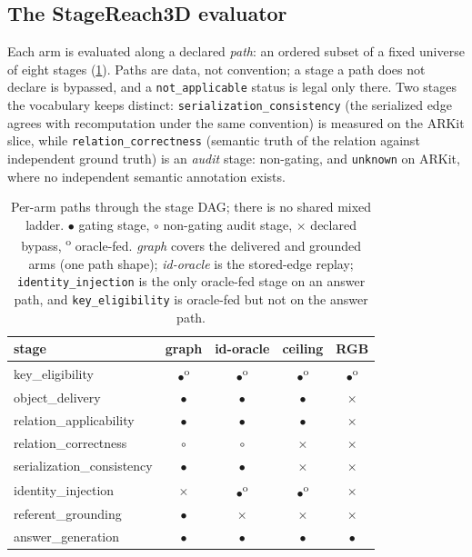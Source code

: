 \subsection{The StageReach3D evaluator}
\label{sec:evaluator}

Each arm is evaluated along a declared \emph{path}: an ordered subset of a fixed
universe of eight stages (\cref{tab:paths}). Paths are data, not convention; a stage a
path does not declare is bypassed, and a \texttt{not\_applicable} status is legal only
there. Two stages the vocabulary keeps distinct:
\texttt{serialization\_consistency} (the serialized edge agrees with recomputation
under the same convention) is measured on the ARKit slice, while
\texttt{relation\_correctness} (semantic truth of the relation against independent
ground truth) is an \emph{audit} stage: non-gating, and \texttt{unknown} on ARKit,
where no independent semantic annotation exists.

\begin{table}[t]
  \centering\footnotesize
  \setlength{\tabcolsep}{4pt}
  \begin{tabular}{@{}lcccc@{}}
    \toprule
    stage & graph & id-oracle & ceiling & RGB\\
    \midrule
    key\_eligibility & $\bullet$\textsuperscript{o} & $\bullet$\textsuperscript{o}
      & $\bullet$\textsuperscript{o} & $\bullet$\textsuperscript{o}\\
    object\_delivery & $\bullet$ & $\bullet$ & $\bullet$ & $\times$\\
    relation\_applicability & $\bullet$ & $\bullet$ & $\bullet$ & $\times$\\
    relation\_correctness & $\circ$ & $\circ$ & $\times$ & $\times$\\
    serialization\_consistency & $\bullet$ & $\bullet$ & $\times$ & $\times$\\
    identity\_injection & $\times$ & $\bullet$\textsuperscript{o} &
      $\bullet$\textsuperscript{o} & $\times$\\
    referent\_grounding & $\bullet$ & $\times$ & $\times$ & $\times$\\
    answer\_generation & $\bullet$ & $\bullet$ & $\bullet$ & $\bullet$\\
    \bottomrule
  \end{tabular}
  \caption{Per-arm paths through the stage DAG; there is no shared mixed ladder.
  $\bullet$ gating stage, $\circ$ non-gating audit stage, $\times$ declared bypass,
  \textsuperscript{o} oracle-fed. \emph{graph} covers the delivered and grounded arms
  (one path shape); \emph{id-oracle} is the stored-edge replay;
  \texttt{identity\_injection} is the only oracle-fed stage on an answer path, and
  \texttt{key\_eligibility} is oracle-fed but not on the answer path.}
  \label{tab:paths}
\end{table}

